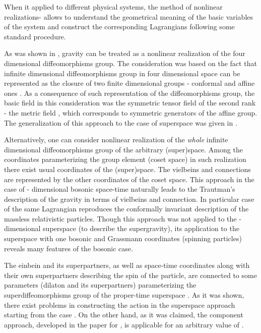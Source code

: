 \documentclass[a4paper,twocolumn,showpacs,preprintnumbers,amsmath,amssymb]{revtex4}
\begin{document}
When it applied to different physical systems,
the method of nonlinear realizations\cite{CWZ}-\cite{V}  allows to understand
the geometrical meaning of the basic variables of the system
and construct the corresponding Lagrangians following some standard
procedure.

As was shown in \cite{BO}, gravity can be treated as a nonlinear
realization of the four dimensional diffeomorphisms group.
The consideration was based on the fact that infinite dimensional
diffeomorphisms group in four dimensional space can be represented as the
closure of two finite dimensional groups - conformal and affine ones \cite{OP}.
As a consequence of such representation of the diffeomorphisms group,
the basic field in this consideration was the symmetric tensor
field of the second rank - the metric field \coordHE{}, which
corresponds to symmetric generators of the affine group.
The generalization of this approach to the case of superspace was
given in \cite{IN}.

Alternatively, one can consider nonlinear realization of the {\it whole}
infinite dimensional diffeomorphisms group of the arbitrary
(super)space. Among the coordinates parameterizing the group element
(coset space)
in such realization there exist
usual coordinates of the (super)space.
The vielbeins and connections are  represented
by the other coordinates of the coset space. This approach
 in the case of \coordHE{}- dimensional bosonic space-time naturally leads to
 the Trautman's\cite{T} description of the gravity in terms of vielbeins
 and connection\cite{P_0}.
 In particular case of \coordHE{} the same Lagrangian reproduces the
 conformally invariant description of the
massless relativistic particles\cite{PK}.
Though this approach was not applied to the \coordHE{}- dimensional
 superspace (to describe the supergravity),
its application to the \coordHE{} superspace with one bosonic and
\coordHE{} Grassmann coordinates \coordHE{}
 (spinning particles)
reveals many features of the bosonic case.

The einbein and its superpartners, as well as space-time
coordinates along with their own superpartners
describing the spin of the particle,
are connected to some parameters (dilaton and its superpartners)
parameterizing the superdiffeomorphisms group of the proper-time
superspace \coordHE{}. As it was shown\cite{P2}, there exist problems in
constructing the action in the superspace approach starting from
the case \coordHE{}. On the other hand, as it was claimed,
the component approach, developed in the paper\cite{P2} for \coordHE{},
is applicable for an arbitrary value of \coordHE{}.
\end{document}

